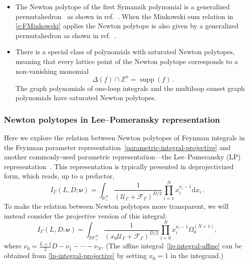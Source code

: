 \documentclass[12pt,a4paper]{article}
\theoremstyle{plain}
\theoremstyle{remark}
\newcommand{\nprops}{N}
\newcommand{\feynpar}{x}
\newcommand{\dd}{\mathrm{d}}
\newcommand{\cU}{\mathscr {U}}
\newcommand{\cF}{\mathscr {F}}
\newcommand{\undernotation}[1]{\pmb{#1}}
\newcommand{\Newton}{\Delta}
\DeclareMathOperator{\supp}{supp}
\begin{document}
\begin{itemize}
\item The Newton polytope of the first Symanzik polynomial is  a generalized permutahedron~\cite{postnikov2005}  as shown in ref.~\cite[Theorem~3.4]{Borinsky:2023jdv}.  When the Minkowski sum relation in \cref{e:FMinkowski} applies the Newton polytope is also given by a generalized permutahedron as shown in ref.~\cite[Theorem~3.5]{Borinsky:2023jdv}.
            
			\item There is a special class of polynomials with saturated Newton polytopes, meaning that
 every lattice point of the
			Newton polytope corresponds to a non-vanishing monomial~\cite{Cara:2019}
			\begin{equation}
				\Newton(f) \cap \mathbb{Z}^n= \supp (f)\, .
			\end{equation}
			The graph polynomials of one-loop integrals
                        and the multiloop sunset graph polynomials have saturated Newton
			polytopes.
		\end{itemize}
		

\subsubsection{Newton polytopes in Lee--Pomeransky representation}
\label{sec:LeePomeransky}

Here we explore the relation between Newton polytopes of Feynman integrals in the Feynman parameter representation~\eqref{parametric-integral-projective} and another commonly-used parametric representation---the Lee--Pomeransky (LP) representation~\cite{Lee:2013hzt}.
This representation is typically presented in deprojectivized form, which reads, up to a prefactor,
\begin{equation}
	I_\Gamma (L,D;\undernotation{\nu}) =
	\int_{\mathbb{R}^{\nprops}_+} \frac{1}{\left( \cU_\Gamma + \cF_\Gamma \right)^{D/2}}
	\prod_{i=1}^{\nprops}
	{\feynpar_i^{\nu_i-1}} \dd x_i \, .
	\label{lp-integral-affine}
\end{equation}
To make the relation between Newton polytopes more transparent, we will instead consider the projective version of this integral:
\begin{equation}
	I_\Gamma (L,D;\undernotation{\nu}) =
	\int_{\mathbb R\mathbb P_+^{\nprops}} \frac{1}{\left( x_0 \cU_\Gamma + \cF_\Gamma \right)^{D/2}}
	\prod_{i=0}^{\nprops}
	{\feynpar_i^{\nu_i-1}}  \Omega_0^{(\nprops+1)} ,
	\label{lp-integral-projective}
\end{equation}
where \(\nu_0 = \frac{L+1}{2} D - \nu_1-\cdots-\nu_\nprops\). (The affine integral~\eqref{lp-integral-affine} can be obtained from \cref{lp-integral-projective} by setting \(x_0 = 1\) in the integrand.)
\end{document}
